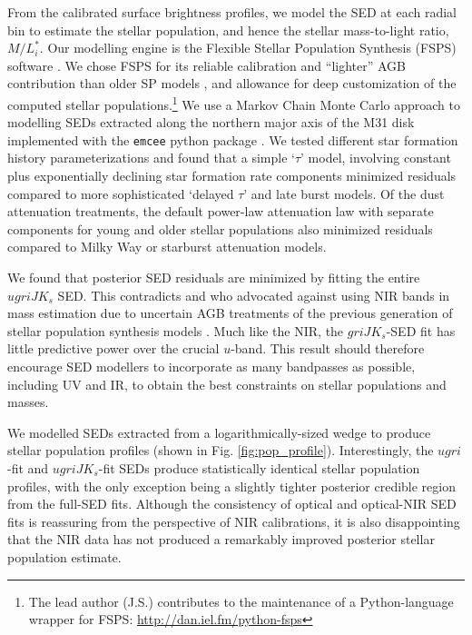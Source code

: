 \documentclass{iau}
\begin{document}
From the calibrated surface brightness profiles, we model the SED at each radial bin to estimate the stellar population, and hence the stellar mass-to-light ratio, $M/L_i^*$.
Our modelling engine is the Flexible Stellar Population Synthesis (FSPS) software \citep{Conroy:2009,Conroy:2010}.
We chose FSPS for its reliable calibration and ``lighter'' AGB contribution than older SP models \citep[e.g.,][]{Bruzual:2003}, and allowance for deep customization of the computed stellar populations.\footnote{The lead author (J.S.) contributes to the maintenance of a Python-language wrapper for FSPS: \url{http://dan.iel.fm/python-fsps}}
We use a Markov Chain Monte Carlo approach to modelling SEDs extracted along the northern major axis of the M31 disk implemented with the \texttt{emcee} python package \citep{Foreman-Mackey:2013}.
We tested different star formation history parameterizations and found that a simple `$\tau$' model, involving constant plus exponentially declining star formation rate components minimized residuals compared to more sophisticated `delayed $\tau$' and late burst models.
Of the dust attenuation treatments, the default power-law attenuation law with separate components for young and older stellar populations also minimized residuals compared to Milky Way or starburst attenuation models.

We found that posterior SED residuals are minimized by fitting the entire $ugriJK_s$ SED.
This contradicts \cite{Taylor:2011} and \cite{Zibetti:2009} who advocated against using NIR bands in mass estimation due to uncertain AGB treatments of the previous generation of stellar population synthesis models \citep[e.g.][]{Bruzual:2003,Maraston:2005}.
Much like the NIR, the $griJK_s$-SED fit has little predictive power over the crucial $u$-band.
This result should therefore encourage SED modellers to incorporate as many bandpasses as possible, including UV and IR, to obtain the best constraints on stellar populations and masses.

We modelled SEDs extracted from a logarithmically-sized wedge \citep[e.g.][their Fig. 2]{Courteau:2011} to produce stellar population profiles (shown in Fig. \ref{fig:pop_profile}).
Interestingly, the $ugri$-fit and $ugriJK_s$-fit SEDs produce statistically identical stellar population profiles, with the only exception being a slightly tighter posterior credible region from the full-SED fits.
Although the consistency of optical and optical-NIR SED fits is reassuring from the perspective of NIR calibrations, it is also disappointing that the NIR data has not produced a remarkably improved posterior stellar population estimate.
\end{document}
